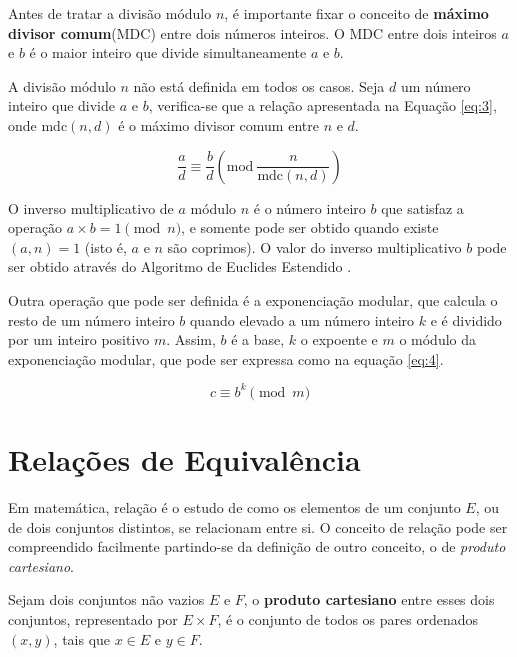 Antes de tratar a divisão módulo \(n\), é importante fixar o conceito de \textbf{máximo divisor comum}(MDC) entre dois números inteiros. O MDC entre dois inteiros \(a\) e \(b\) 
é o maior inteiro que divide simultaneamente \(a\) e \(b\).

A divisão módulo $n$ não está definida em todos os casos. Seja \(d\) um número inteiro que divide \(a\) e \(b\), verifica-se que a relação apresentada na Equação \ref{eq:3}, onde mdc\((n, d)\) é o máximo divisor comum entre \(n\) e \(d\).

\begin{equation}
  \frac{a}{d} \equiv \frac{b}{d}\left(\mbox{mod}\ \frac{n}{\text{mdc}(n,d)}\right) \label{eq:3}
\end{equation}

O inverso multiplicativo de $a$ módulo \(n\) é o número inteiro \(b\) que satisfaz a operação \(a \times b = 1 \pmod  n\), e somente pode ser obtido quando existe \((a, n) = 1\) (isto é, \(a\) e \(n\) são coprimos). O valor do inverso multiplicativo \(b\) pode ser obtido através do Algoritmo de Euclides Estendido \cite{Halim:2013}.

\par Outra operação que pode ser definida é a exponenciação modular, que calcula o resto de um número inteiro \(b\) quando elevado a um número inteiro \(k\) e é dividido por um inteiro positivo \(m\). Assim, $b$ é a base, $k$ o expoente e $m$ o módulo da exponenciação modular, que pode ser expressa como na equação \ref{eq:4}.

\begin{equation}
  c \equiv b^k\pmod m \label{eq:4}
\end{equation}


%
%
\section{Relações de Equivalência}

Em matemática, relação é o estudo de como os elementos de um conjunto $E$, ou de dois conjuntos distintos, se relacionam entre si\cite{Domingues:2003}. O conceito de relação pode ser compreendido facilmente partindo-se da definição de outro conceito, o de \textit{produto cartesiano}.

Sejam dois conjuntos não vazios \(E\) e \(F\), o \textbf{produto cartesiano} entre esses dois conjuntos, representado por \(E \times F\), é o conjunto de todos os pares ordenados \((x, y)\), tais que \(x \in E\) e \(y \in F\).


